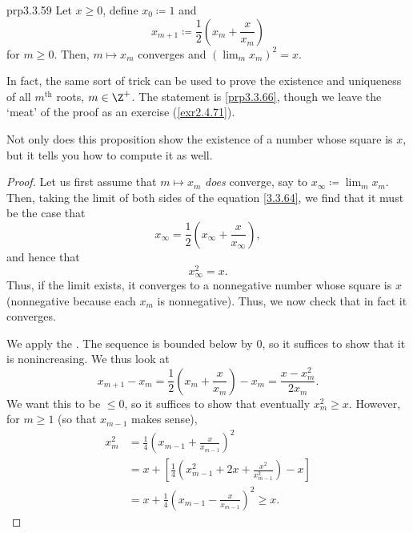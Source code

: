 \begin{prp}{}{prp3.3.59}
Let $x\geq 0$, define $x_0\coloneqq 1$ and
\begin{equation}\label{3.3.64}
x_{m+1}\coloneqq \frac{1}{2}\left( x_m+\frac{x}{x_m}\right)
\end{equation}
for $m\geq 0$.  Then, $m\mapsto x_m$ converges and $(\lim _mx_m)^2=x$.
\begin{rmk}
In fact, the same sort of trick can be used to prove the existence and uniqueness of all $m^{\text{th}}$ roots, $m\in \Z ^+$.  The statement is \cref{prp3.3.66}, though we leave the `meat' of the proof as an exercise (\cref{exr2.4.71}).
\end{rmk}
\begin{rmk}
Not only does this proposition show the existence of a number whose square is $x$, but it tells you how to compute it as well.
\end{rmk}
\begin{proof}
Let us first assume that $m\mapsto x_m$ \emph{does} converge, say to $x_\infty \coloneqq \lim _mx_m$.  Then, taking the limit of both sides of the equation \eqref{3.3.64}, we find that it must be the case that
\begin{equation}
x_\infty =\frac{1}{2}\left( x_\infty +\frac{x}{x_\infty}\right) ,
\end{equation}
and hence that
\begin{equation}
x_\infty ^2=x.
\end{equation}
Thus, if the limit exists, it converges to a nonnegative number whose square is $x$ (nonnegative because each $x_m$ is nonnegative).  Thus, we now check that in fact it converges.

We apply the .  The sequence is bounded below by $0$, so it suffices to show that it is nonincreasing.  We thus look at
\begin{equation}
x_{m+1}-x_m=\frac{1}{2}\left( x_m+\frac{x}{x_m}\right) -x_m=\frac{x-x_m^2}{2x_m}.
\end{equation}
We want this to be $\leq 0$, so it suffices to show that eventually $x_m^2\geq x$.  However, for $m\geq 1$ (so that $x_{m-1}$ makes sense),
\begin{equation}
\begin{split}
x_m^2 & =\frac{1}{4}\left( x_{m-1}+\frac{x}{x_{m-1}}\right) ^2 \\
& =x+\left[ \frac{1}{4}\left( x_{m-1}^2+2x+\frac{x^2}{x_{m-1}^2}\right) -x\right] \\
& =x+\frac{1}{4}\left( x_{m-1}-\frac{x}{x_{m-1}}\right) ^2\geq x.
\end{split}
\end{equation}
\end{proof}
\end{prp}
